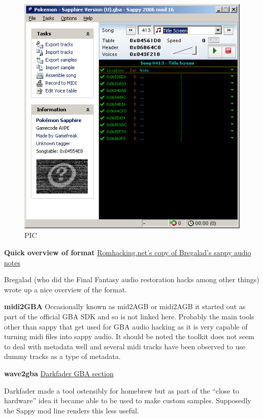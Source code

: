 \documentclass[
]{book}
\begin{document}
\begin{figure}
\centering
\includegraphics{images/165_home_fast6191_romhackingguide_unrenamed_fil___al_borders_romhackingguidesappy2006_mod16_1.png}
\caption{PIC}
\end{figure}

\textbf{Quick overview of format} \href{http://www.romhacking.net/documents/462/}{Romhacking.net's copy of Bregalad's sappy audio notes}

Bregalad (who did the Final Fantasy audio restoration hacks among other things) wrote up a nice overview of the format.

\textbf{midi2GBA} Occasionally known as mid2AGB or midi2AGB it started out as part of the official GBA SDK and so is not linked here. Probably the main tools other than sappy that get used for GBA audio hacking as it is very capable of turning midi files into sappy audio. It should be noted the toolkit does not seem to deal with metadata well and several midi tracks have been observed to use dummy tracks as a type of metadata.

\textbf{wave2gba} \href{http://www.darkfader.net/gba/}{Darkfader GBA section}

Darkfader made a tool ostensibly for homebrew but as part of the ``close to hardware'' idea it became able to be used to make custom samples. Supposedly the Sappy mod line renders this less useful.
\end{document}
